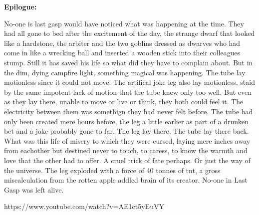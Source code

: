 \textbf{Epilogue:}\medskip

No-one is last gasp would have noticed what was happening at the time. They had all gone to bed after the excitement of the day, the strange dwarf that looked like a hardstone, the arbiter and the two goblins dressed as dwarves who had come in like a wrecking ball and inserted a wooden stick into their colleagues stump. Still it has saved his life so what did they have to complain about. But in the dim, dying campfire light, something magical was happening. The tube lay motionless since it could not move. The artifical joke leg also lay motionless, staid by the same impotent lack of motion that the tube knew only too well. But even as they lay there, unable to move or live or think, they both could feel it. The electricity between them was somethign they had never felt before. The tube had only been created mere hours before, the leg a little earlier as part of a drunken bet and a joke probably gone to far. The leg lay there. The tube lay there back. What was this life of misery to which they were cursed, laying mere inches away from eachother but destined never to touch, to caress, to know the warmth and love that the other had to offer. A cruel trick of fate perhaps. Or just the way of the universe. The leg exploded with a force of 40 tonnes of tnt, a gross miscalculation from the rotten apple addled brain of its creator. No-one in Last Gasp was left alive.\medskip

https://www.youtube.com/watch?v=AE1ct5yEuVY

\vspace*{5mm}

